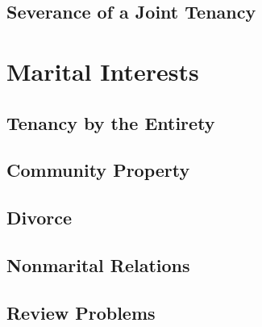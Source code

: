 


\subsection{Severance of a Joint Tenancy}






\begin{questions}

\end{questions}

\section{Marital Interests}


\subsection{Tenancy by the Entirety}



\begin{questions}

\end{questions}

\subsection{Community Property}




\subsection{Divorce}



\begin{questions}

\end{questions}

\subsection{Nonmarital Relations}






\begin{questions}

\end{questions}


\subsection{Review Problems}

\begin{questions}[]

\end{questions}

